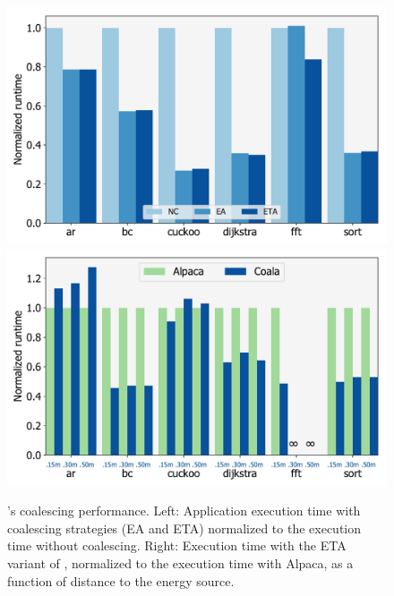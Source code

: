 \begin{figure}
	\includegraphics[width=0.5\columnwidth]{figures/coalStrategies}%
	\includegraphics[width=0.5\columnwidth]{figures/coala_alpaca_gcc}
    \caption{\sys's coalescing performance. Left: Application execution time
with coalescing strategies (EA and ETA) normalized to the execution time
without coalescing. Right: Execution time with the ETA variant of \sys,
normalized to the execution time with Alpaca, as a function of distance to the
energy source.}
	\label{fig:coalescing}
	\label{fig:runtime}
\end{figure}

%

